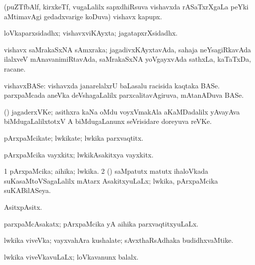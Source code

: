 \bentry
{} 
\gl{\nA}
\expl{}
\bmng
(puZTfbAlf, kirxkeTf, \mo vugaLalilx sapxdhiRsuva vishavxda rASaTxrXgaLa peYki aMtimavAgi gedadxvarige koDuva) vishavx kapupx. 
\emng
\eentry

\bentry
{} 
\gl{\gu}
\expl{}
\bmng
loVkaparxsidadhx; vishavxviKAyxta; jagatapxrXsidadhx. 
\emng
\eentry

\bentry
{} 
\gl{\nA}
\expl{}
\bmng
vishavx saMrakaSxNA sAmxraka; jagadivxKAyxtavAda, sahaja neYsagiRkavAda ilalxveV mAnavanimiRtavAda, saMrakaSxNA yoVgayxvAda sathxLa, kaTaTxDa, racane. 
\emng
\eentry

\bentry
{} 
\gl{\nA}
\expl{}
\bmng
vishavxBASe: 
\banum
{} vishavxda janarelalxrU baLasalu racisida kaqtaka BASe. 
 parxpaMcada aneVka deVshagaLalilx parxcalitavAgiruva, mAtanADuva BASe. 
\eanum
\emng
\eentry

\bentry
{} 
\gl{\nA}
\expl{}
\bmng
(\Bwvi) jagaderxVKe; asithxra kaNa oMdu voyxVmakAla  aKaMDadalilx yAvayAva biMdugaLalilxtotxV A biMdugaLanunx seVrisidare doreyuva reVKe. 
\emng
\eentry

\bentry
{} 
\gl{\nA}
\expl{}
\bmng
pArxpaMcikate; lwkikate; lwkika parxvaqtitx. 
\emng
\eentry

\bentry
{} 
\gl{\nA}
\expl{}
\bmng
pArxpaMcika vayxkitx; lwkikAsakitxya vayxkitx. 
\emng
\eentry

\bentry
{} 
\gl{\gu}
\bmng
\bnum
\num{1} pArxpaMcika; aihika; lwkika. 
\num{2} (\kanmu) saMpatutx matutx ihaloVkada suKasaMtoVSagaLalilx mAtarx AsakitxyuLaLx; lwkika, pArxpaMcika suKABilASeya. 
\enum
\emng

\noindent 
\gl{\pagu}
\expl{}
\bmng
{} AsitxpAsitx. 
\emng
\eentry

\bentry
{} 
\gl{\gu}
\expl{}
\bmng
parxpaMcAsakatx; pArxpaMcika yA aihika parxvaqtitxyuLaLx. 
\emng
\eentry

\bentry
{} 
\gl{\nA}
\expl{}
\bmng
lwkika viveVka; vayxvahAra kushalate; sAvxthaRsAdhaka budidhxvaMtike. 
\emng
\eentry

\bentry
{} 
\gl{\gu}
\expl{}
\bmng
lwkika viveVkavuLaLx; loVkavanunx balalx. 
\emng
\eentry

